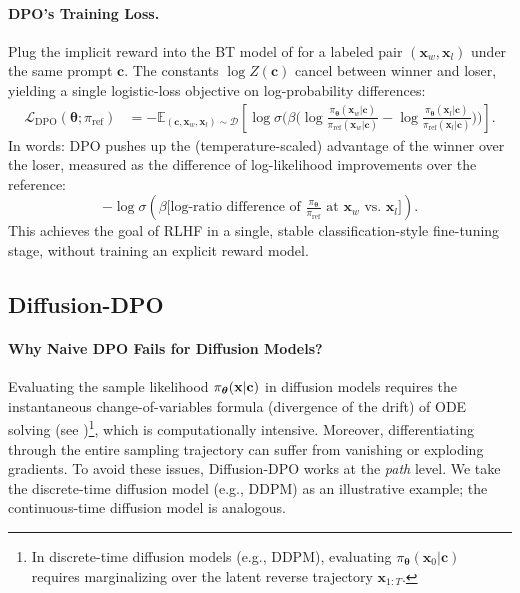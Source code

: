 \paragraph{DPO's Training Loss.}
Plug the implicit reward  into the BT model of  for a labeled pair $(\mathbf x_w,\mathbf x_l)$ under the same prompt $\mathbf c$. 
The constants $\log Z(\mathbf c)$ cancel between winner and loser, yielding a single logistic-loss objective on log-probability differences:
\begin{align*}
\mathcal L_{\mathrm{DPO}}(\bm\theta;\pi_{\mathrm{ref}})
&=
-\mathbb E_{(\mathbf c,\mathbf x_w,\mathbf x_l)\sim\mathcal D} \left[
\log \sigma \Big(
\beta\big(
\log\frac{\pi_{\bm\theta}(\mathbf x_w|\mathbf c)}{\pi_{\mathrm{ref}}(\mathbf x_w|\mathbf c)}
-
\log\frac{\pi_{\bm\theta}(\mathbf x_l|\mathbf c)}{\pi_{\mathrm{ref}}(\mathbf x_l|\mathbf c)}
\big)
\Big)
\right].
\end{align*}
In words: DPO pushes up the (temperature-scaled) advantage of the winner over the loser, measured as the difference of log-likelihood improvements over the reference:
\[
-\log \sigma \left(
  \beta 
  \bigl[
    \text{log-ratio difference of }
    \tfrac{\pi_{\bm\theta}}{\pi_{\mathrm{ref}}}
    \text{ at } \mathbf x_w \text{ vs.\ } \mathbf x_l
  \bigr]
\right).
\]
This achieves the goal of RLHF in a single, stable classification-style
fine-tuning stage, without training an explicit reward model.


\subsection{Diffusion-DPO}\label{subsec:diffusion-dpo}
\paragraph{Why Naive DPO Fails for Diffusion Models?}
Evaluating the sample likelihood $\pi_{\bm{\theta}}(\mathbf x|\mathbf c)$ in diffusion models requires the instantaneous change-of-variables formula (divergence of the drift) of ODE solving (see )\footnote{In discrete-time diffusion models (e.g., DDPM), evaluating $\pi_{\bm\theta}(\mathbf x_0| \mathbf c)$ requires marginalizing over the latent reverse trajectory $\mathbf x_{1:T}$.
}, which is computationally intensive. Moreover, differentiating through the entire sampling trajectory can suffer from vanishing or exploding gradients. To avoid these issues, Diffusion-DPO works at the \emph{path} level. We take the discrete-time diffusion model (e.g., DDPM) as an illustrative example; the continuous-time diffusion model is analogous.

